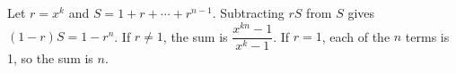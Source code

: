 Let $r=x^k$ and $S=1+r+\cdots+r^{n-1}$. Subtracting $rS$ from $S$ gives $(1-r)S=1-r^n$. If $r\ne1$, the sum is $\boxed{\dfrac{x^{kn}-1}{x^k-1}}$. If $r=1$, each of the $n$ terms is 1, so the sum is $\boxed{n}$.
